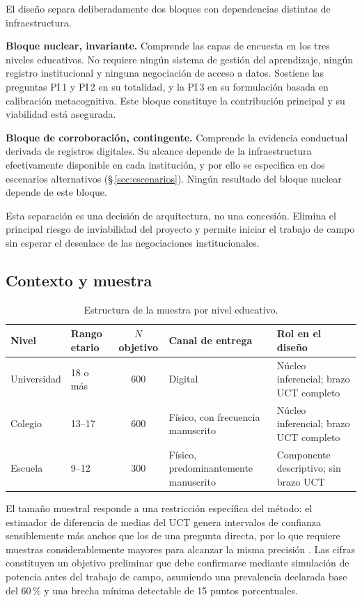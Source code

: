 \documentclass[11pt,a4paper]{article}
\begin{document}
El diseño separa deliberadamente dos bloques con dependencias distintas de infraestructura.

\textbf{Bloque nuclear, invariante.} Comprende las capas de encuesta en los tres niveles educativos. No requiere ningún sistema de gestión del aprendizaje, ningún registro institucional y ninguna negociación de acceso a datos. Sostiene las preguntas PI\,1 y PI\,2 en su totalidad, y la PI\,3 en su formulación basada en calibración metacognitiva. Este bloque constituye la contribución principal y su viabilidad está asegurada.

\textbf{Bloque de corroboración, contingente.} Comprende la evidencia conductual derivada de registros digitales. Su alcance depende de la infraestructura efectivamente disponible en cada institución, y por ello se especifica en dos escenarios alternativos (§\,\ref{sec:escenarios}). Ningún resultado del bloque nuclear depende de este bloque.

Esta separación es una decisión de arquitectura, no una concesión. Elimina el principal riesgo de inviabilidad del proyecto y permite iniciar el trabajo de campo sin esperar el desenlace de las negociaciones institucionales.

\subsection{Contexto y muestra}

\begin{table}[htbp]
	\centering
	\small
	\caption{Estructura de la muestra por nivel educativo.}
	\begin{tabularx}{\textwidth}{L{2.7cm} L{2.1cm} c L{2.4cm} X}
		\toprule
		\textbf{Nivel} & \textbf{Rango etario} & \textbf{$N$ objetivo} & \textbf{Canal de entrega} & \textbf{Rol en el diseño} \\
		\midrule
		Universidad & 18 o más & 600 & Digital & Núcleo inferencial; brazo UCT completo \\
		\addlinespace
		Colegio & 13--17 & 600 & Físico, con frecuencia manuscrito & Núcleo inferencial; brazo UCT completo \\
		\addlinespace
		Escuela & 9--12 & 300 & Físico, predominantemente manuscrito & Componente descriptivo; sin brazo UCT \\
		\bottomrule
	\end{tabularx}
\end{table}

El tamaño muestral responde a una restricción específica del método: el estimador de diferencia de medias del UCT genera intervalos de confianza sensiblemente más anchos que los de una pregunta directa, por lo que requiere muestras considerablemente mayores para alcanzar la misma precisión \citep{hinsley2019asking}. Las cifras constituyen un objetivo preliminar que debe confirmarse mediante simulación de potencia antes del trabajo de campo, asumiendo una prevalencia declarada base del 60\,\% y una brecha mínima detectable de 15 puntos porcentuales.
\end{document}
